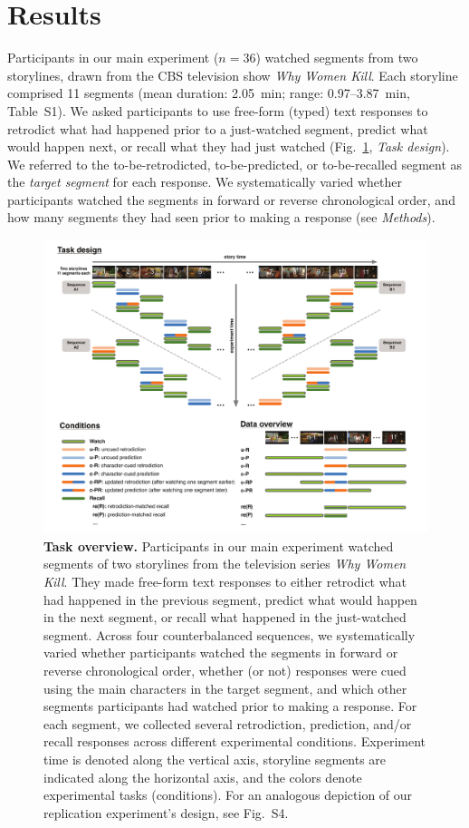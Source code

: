 \documentclass[10pt]{article}
\newcommand{\stimDescription}{S1} %
\newcommand{\MethodsReplExp}{S4}
\begin{document}
\section*{Results}
Participants in our main experiment ($n = 36$) watched segments from two storylines, drawn from the CBS television show \textit{Why Women Kill}.  Each storyline comprised 11 segments (mean duration: 2.05~min; range: 0.97--3.87~min, Table~\stimDescription).  We asked participants to use free-form (typed) text responses to retrodict what had happened prior to a just-watched segment, predict what would happen next, or recall what they had just watched (Fig.~\ref{fig:method}, \textit{Task design}). We referred to the to-be-retrodicted, to-be-predicted, or to-be-recalled segment as the \textit{target segment} for each response. We systematically varied whether participants watched the segments in forward or reverse chronological order, and how many segments they had seen prior to making a response (see \textit{Methods}).

\begin{figure}[tp]
  \centering
  \includegraphics[width=\textwidth]{methods}
  \caption{\textbf{Task overview.} Participants in our main experiment watched segments of two storylines from the television series \textit{Why Women Kill}.  They made free-form text responses to either retrodict what had happened in the previous segment, predict what would happen in the next segment, or recall what happened in the just-watched segment. Across four counterbalanced sequences, we systematically varied whether participants watched the segments in forward or reverse chronological order, whether (or not) responses were cued using the main characters in the target segment, and which other segments participants had watched prior to making a response.  For each segment, we collected several retrodiction, prediction, and/or recall responses across different experimental conditions.  Experiment time is denoted along the
  vertical axis, storyline segments are indicated along the horizontal axis, and the colors denote experimental tasks (conditions).  For an analogous depiction of our replication experiment's design, see Fig.~\MethodsReplExp.}
  \label{fig:method}
\end{figure}
\end{document}
